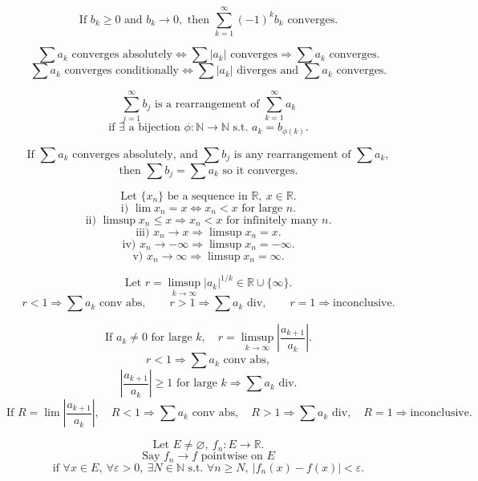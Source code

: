 \documentclass[11pt]{article}
\begin{document}
\[
\text{If }b_k\ge0\text{ and }b_k\to0,\text{ then }
\sum_{k=1}^{\infty}(-1)^kb_k\text{ converges.}
\]

\newpage


\[
\sum a_k\text{ converges absolutely}
\Longleftrightarrow
\sum |a_k|\text{ converges}
\Longrightarrow
\sum a_k\text{ converges.}
\]
\[
\sum a_k\text{ converges conditionally}
\Longleftrightarrow
\sum |a_k|\text{ diverges and }\sum a_k\text{ converges.}
\]

\[
\sum_{j=1}^{\infty}b_j\text{ is a rearrangement of }\sum_{k=1}^{\infty}a_k
\]
\[
\text{if }\exists\text{ a bijection }\phi:\mathbb N\to\mathbb N
\text{ s.t. }a_k=b_{\phi(k)}.
\]

\[
\text{If }\sum a_k\text{ converges absolutely, and }\sum b_j
\text{ is any rearrangement of }\sum a_k,
\]
\[
\text{then }\sum b_j=\sum a_k\text{ so it converges.}
\]

\[
\text{Let }\{x_n\}\text{ be a sequence in }\mathbb R,\ x\in\mathbb R.
\]
\[
\text{i) }\lim x_n=x
\Longleftrightarrow
x_n<x\text{ for large }n.
\]
\[
\text{ii) }\limsup x_n\le x
\Longrightarrow
x_n<x\text{ for infinitely many }n.
\]
\[
\text{iii) }x_n\to x
\Longrightarrow
\limsup x_n=x.
\]
\[
\text{iv) }x_n\to-\infty
\Longrightarrow
\limsup x_n=-\infty.
\]
\[
\text{v) }x_n\to\infty
\Longrightarrow
\limsup x_n=\infty.
\]

\[
\text{Let }r=\limsup_{k\to\infty}|a_k|^{1/k}\in\mathbb R\cup\{\infty\}.
\]
\[
r<1\Longrightarrow\sum a_k\text{ conv abs},\qquad
r>1\Longrightarrow\sum a_k\text{ div},\qquad
r=1\Longrightarrow\text{inconclusive.}
\]

\[
\text{If }a_k\ne0\text{ for large }k,\quad
r=\limsup_{k\to\infty}\left|\frac{a_{k+1}}{a_k}\right|.
\]
\[
r<1\Longrightarrow\sum a_k\text{ conv abs},
\]
\[
\left|\frac{a_{k+1}}{a_k}\right|\ge1\text{ for large }k
\Longrightarrow\sum a_k\text{ div}.
\]
\[
\text{If }R=\lim\left|\frac{a_{k+1}}{a_k}\right|,\quad
R<1\Longrightarrow\sum a_k\text{ conv abs},\quad
R>1\Longrightarrow\sum a_k\text{ div},\quad
R=1\Longrightarrow\text{inconclusive.}
\]

\newpage


\[
\text{Let }E\ne\varnothing,\ f_n:E\to\mathbb R.
\]
\[
\text{Say }f_n\to f\text{ pointwise on }E
\]
\[
\text{if }\forall x\in E,\ \forall\varepsilon>0,\ \exists N\in\mathbb N
\text{ s.t. }\forall n\ge N,\ |f_n(x)-f(x)|<\varepsilon.
\]
\end{document}
